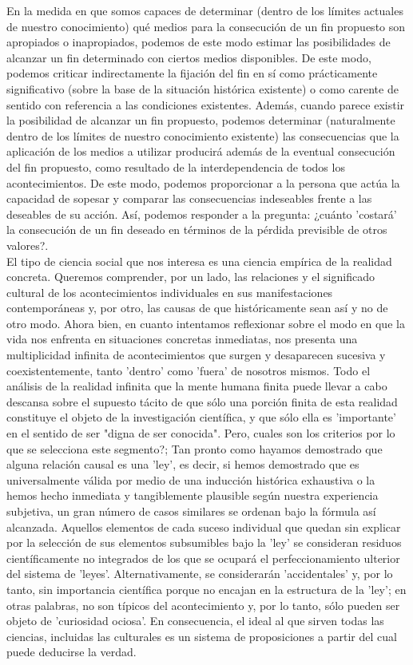 En la medida en que somos capaces de determinar (dentro de los límites actuales de nuestro conocimiento) qué medios para la consecución de un fin propuesto son apropiados o inapropiados, podemos de este modo estimar las posibilidades de alcanzar un fin determinado con ciertos medios disponibles. De este modo, podemos criticar indirectamente la fijación del fin en sí como prácticamente significativo (sobre la base de la situación histórica existente) o como carente de sentido con referencia a las condiciones existentes. Además, cuando parece existir la posibilidad de alcanzar un fin propuesto, podemos determinar (naturalmente dentro de los límites de nuestro conocimiento existente) las consecuencias que la aplicación de los medios a utilizar producirá además de la eventual consecución del fin propuesto, como resultado de la interdependencia de todos los acontecimientos. De este modo, podemos proporcionar a la persona que actúa la capacidad de sopesar y comparar las consecuencias indeseables frente a las deseables de su acción. Así, podemos responder a la pregunta: ¿cuánto 'costará' la consecución de un fin deseado en términos de la pérdida previsible de otros valores?.\\

El tipo de ciencia social que nos interesa es una ciencia empírica de la realidad concreta. Queremos comprender, por un lado, las relaciones y el significado cultural de los acontecimientos individuales en sus manifestaciones contemporáneas y, por otro, las causas de que históricamente sean así y no de otro modo. Ahora bien, en cuanto intentamos reflexionar sobre el modo en que la vida nos enfrenta en situaciones concretas inmediatas, nos presenta una multiplicidad infinita de acontecimientos que surgen y desaparecen sucesiva y coexistentemente, tanto 'dentro' como 'fuera' de nosotros mismos. Todo el análisis de la realidad infinita que la mente humana finita puede llevar a cabo descansa sobre el supuesto tácito de que sólo una porción finita de esta realidad constituye el objeto de la investigación científica, y que sólo ella es 'importante' en el sentido de ser "digna de ser conocida". Pero, cuales son los criterios por lo que se selecciona este segmento?; Tan pronto como hayamos demostrado que alguna relación causal es una 'ley', es decir, si hemos demostrado que es universalmente válida por medio de una inducción histórica exhaustiva o la hemos hecho inmediata y tangiblemente plausible según nuestra experiencia subjetiva, un gran número de casos similares se ordenan bajo la fórmula así alcanzada. Aquellos elementos de cada suceso individual que quedan sin explicar por la selección de sus elementos subsumibles bajo la 'ley' se consideran residuos científicamente no integrados de los que se ocupará el perfeccionamiento ulterior del sistema de 'leyes'. Alternativamente, se considerarán 'accidentales' y, por lo tanto, sin importancia científica porque no encajan en la estructura de la 'ley'; en otras palabras, no son típicos del acontecimiento y, por lo tanto, sólo pueden ser objeto de 'curiosidad ociosa'. En consecuencia, el ideal al que sirven todas las ciencias, incluidas las culturales es un sistema de proposiciones a partir del cual puede deducirse la verdad.\\

